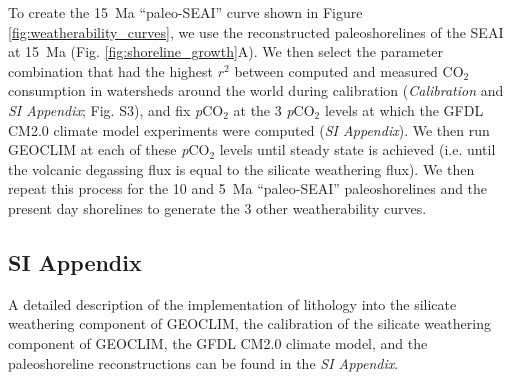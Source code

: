 \documentclass[9pt,twocolumn,twoside,lineno]{pnas-new}
\newcommand{\pCOtwo}{\textit{p}CO$_{2}$\xspace}
\newcommand{\COtwo}{CO$_{2}$\xspace}
\newcommand{\SI}{\textit{SI Appendix}\xspace}
\begin{document}
{To create the 15~Ma ``paleo-SEAI'' curve shown in Figure \ref{fig:weatherability_curves}, we use the reconstructed paleoshorelines of the SEAI at 15~Ma (Fig. \ref{fig:shoreline_growth}A). We then select the parameter combination that had the highest $r^{2}$ between computed and measured \COtwo consumption in watersheds around the world during calibration (\textit{Calibration} and \SI; Fig. S3), and fix \pCOtwo at the 3 \pCOtwo levels at which the GFDL CM2.0 climate model experiments were computed (\SI). We then run GEOCLIM at each of these \pCOtwo levels until steady state is achieved (i.e. until the volcanic degassing flux is equal to the silicate weathering flux). We then repeat this process for the 10 and 5~Ma ``paleo-SEAI'' paleoshorelines and the present day shorelines to generate the 3 other weatherability curves. 

\subsection*{SI Appendix}

A detailed description of the implementation of lithology into the silicate weathering component of GEOCLIM, the calibration of the silicate weathering component of GEOCLIM, the GFDL CM2.0 climate model, and the paleoshoreline reconstructions can be found in the \SI.
}

\showmatmethods{} %


\showacknow{} %


\end{document}
